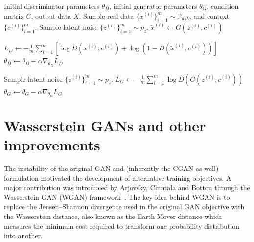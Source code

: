 \begin{algorithm}[H]
\caption{Standard Conditional CGAN Training}
\label{alg: cgan}
\begin{algorithmic}[1]
\REQUIRE Initial discriminator parameters $\theta_D$, initial generator parameters $\theta_G$, condition matrix $C$, output data $X$.
    \STATE Sample real data $\{x^{(i)}\}_{i=1}^m \sim \mathbb{P}_{data}$ and context $\{c^{(i)}\}_{i=1}^m$.
    \STATE Sample latent noise $\{z^{(i)}\}_{i=1}^m \sim p_z$.
    \STATE $\tilde{x}^{(i)} \leftarrow G(z^{(i)}, c^{(i)})$ 
    
    \STATE {}
    \STATE $L_{D} \leftarrow -\frac{1}{m} \sum_{i=1}^m \left[ \log D(x^{(i)}, c^{(i)}) + \log(1 - D(\tilde{x}^{(i)}, c  ^{(i)})) \right]$
    \STATE $\theta_D \leftarrow \theta_D - \alpha \nabla_{\theta_D} L_{D}$ 
    
    \STATE Sample latent noise $\{z^{(i)}\}_{i=1}^m \sim p_z$.
    \STATE {} 
    \STATE $L_{G} \leftarrow -\frac{1}{m} \sum_{i=1}^m \log D(G(z^{(i)}, c^{(i)}))$
    \STATE $\theta_G \leftarrow \theta_G - \alpha \nabla_{\theta_G} L_{G}$ 
\ENDWHILE
\end{algorithmic}
\end{algorithm}


\section{Wasserstein GANs and other improvements}
The instability of the original GAN and (inherently the CGAN as well) formulation motivated the development of
alternative training objectives.
A major contribution was introduced by Arjovsky, Chintala and Bottou
through the Wasserstein GAN (WGAN) framework~\cite{background:wgan}.
The key idea behind WGAN is to replace the Jensen--Shannon divergence used in
the original GAN objective with the Wasserstein distance, also known as the
Earth Mover distance which measures the minimum cost required to transform one
probability distribution into another.

